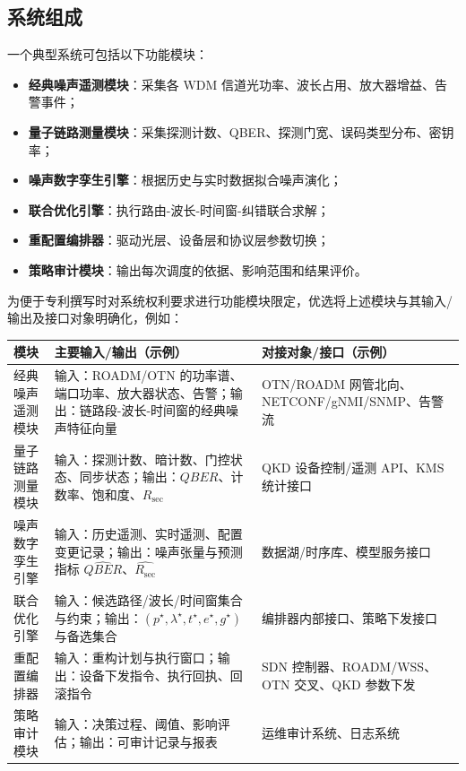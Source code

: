 \documentclass[12pt,a4paper]{article}
\begin{document}
\subsection{系统组成}

一个典型系统可包括以下功能模块：
\begin{itemize}[noitemsep]
    \item \textbf{经典噪声遥测模块}：采集各 WDM 信道光功率、波长占用、放大器增益、告警事件；
    \item \textbf{量子链路测量模块}：采集探测计数、QBER、探测门宽、误码类型分布、密钥率；
    \item \textbf{噪声数字孪生引擎}：根据历史与实时数据拟合噪声演化；
    \item \textbf{联合优化引擎}：执行路由-波长-时间窗-纠错联合求解；
    \item \textbf{重配置编排器}：驱动光层、设备层和协议层参数切换；
    \item \textbf{策略审计模块}：输出每次调度的依据、影响范围和结果评价。
\end{itemize}

为便于专利撰写时对系统权利要求进行功能模块限定，优选将上述模块与其输入/输出及接口对象明确化，例如：
\renewcommand{\arraystretch}{1.2}
\small
\setlength{\tabcolsep}{4pt}
\begin{tabularx}{\textwidth}{|L{3.2cm}|X|L{3.2cm}|}
\hline
\textbf{模块} & \textbf{主要输入/输出（示例）} & \textbf{对接对象/接口（示例）} \\
\hline
经典噪声遥测模块 & 输入：ROADM/OTN 的功率谱、端口功率、放大器状态、告警；输出：链路段-波长-时间窗的经典噪声特征向量 & OTN/ROADM 网管北向、NETCONF/\allowbreak gNMI/\allowbreak SNMP、告警流 \\
\hline
量子链路测量模块 & 输入：探测计数、暗计数、门控状态、同步状态；输出：$QBER$、计数率、饱和度、$R_{\mathrm{sec}}$ & QKD 设备控制/遥测 API、KMS 统计接口 \\
\hline
噪声数字孪生引擎 & 输入：历史遥测、实时遥测、配置变更记录；输出：噪声张量与预测指标 $\widehat{QBER}$、$\widehat{R_{\mathrm{sec}}}$ & 数据湖/时序库、模型服务接口 \\
\hline
联合优化引擎 & 输入：候选路径/波长/时间窗集合与约束；输出：$(p^\star,\lambda^\star,t^\star,e^\star,g^\star)$ 与备选集合 & 编排器内部接口、策略下发接口 \\
\hline
重配置编排器 & 输入：重构计划与执行窗口；输出：设备下发指令、执行回执、回滚指令 & SDN 控制器、ROADM/\allowbreak WSS、OTN 交叉、QKD 参数下发 \\
\hline
策略审计模块 & 输入：决策过程、阈值、影响评估；输出：可审计记录与报表 & 运维审计系统、日志系统 \\
\hline
\end{tabularx}
\normalsize
\setlength{\tabcolsep}{6pt}
\end{document}
